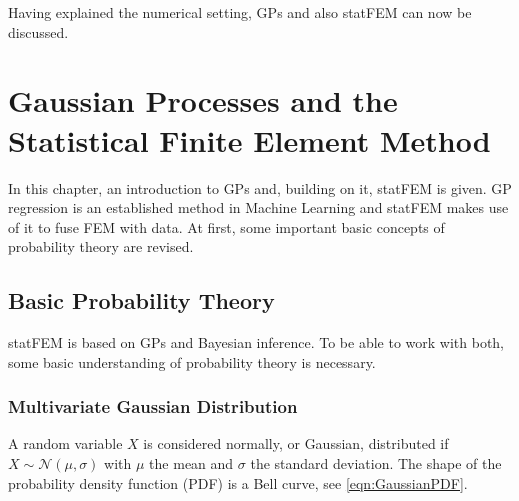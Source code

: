 \documentclass[%
  a4paper,oneside,%
  11pt,%
  smallchapters,
  style=printdev,
  extramargin,
  green,%
  rgb, <cmyk>
  ]{tubsbook}
\begin{document}
\FloatBarrier
Having explained the numerical setting, GPs and also statFEM can now be discussed.








\chapter{Gaussian Processes and the Statistical Finite Element Method}
In this chapter, an introduction to GPs and, building on it, statFEM is given. GP regression is an established method in Machine Learning and statFEM makes use of it to fuse FEM with data. At first, some important basic concepts of probability theory are revised.



\section{Basic Probability Theory}
statFEM is based on GPs and Bayesian inference. To be able to work with both, some basic understanding of probability theory is necessary.


\subsection{Multivariate Gaussian Distribution}
\label{sec:MultiGauss}

A random variable $X$ is considered normally, or Gaussian, distributed if $X \sim \mathcal{N}(\mu, \sigma)$ with $\mu$ the mean and $\sigma$ the standard deviation. The shape of the probability density function (PDF) is a Bell curve, see \eqref{eqn:GaussianPDF}.
\end{document}
